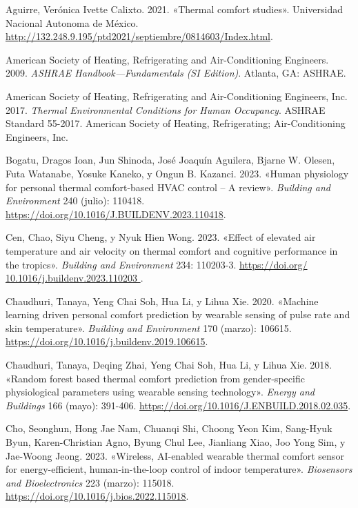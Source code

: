 \documentclass[
  12pt,
  letterpaper,
  DIV=11,
  numbers=noendperiod]{scrreport}
\newlength{\cslhangindent}
\newlength{\cslentryspacingunit} %
\newenvironment{CSLReferences}[2] %
 {%
  \setlength{\parindent}{0pt}
  \ifodd #1
  \let\oldpar\par
  \def\par{\hangindent=\cslhangindent\oldpar}
  \fi
  \setlength{\parskip}{#2\cslentryspacingunit}
 }%
 {}
\begin{document}
\hypertarget{refs}{}
\begin{CSLReferences}{1}{0}
\leavevmode{}%
Aguirre, Verónica Ivette Calixto. 2021. {«Thermal comfort studies»}.
Universidad Nacional Autonoma de México.
\url{http://132.248.9.195/ptd2021/septiembre/0814603/Index.html}.

\leavevmode{}%
American Society of Heating, Refrigerating and Air-Conditioning
Engineers. 2009. \emph{ASHRAE Handbook---Fundamentals (SI Edition)}.
Atlanta, GA: ASHRAE.

\leavevmode{}%
American Society of Heating, Refrigerating and Air-Conditioning
Engineers, Inc. 2017. \emph{Thermal Environmental Conditions for Human
Occupancy}. ASHRAE Standard 55-2017. American Society of Heating,
Refrigerating; Air-Conditioning Engineers, Inc.

\leavevmode{}%
Bogatu, Dragos Ioan, Jun Shinoda, José Joaquín Aguilera, Bjarne W.
Olesen, Futa Watanabe, Yosuke Kaneko, y Ongun B. Kazanci. 2023. {«Human
physiology for personal thermal comfort-based HVAC control -- A
review»}. \emph{Building and Environment} 240 (julio): 110418.
\url{https://doi.org/10.1016/J.BUILDENV.2023.110418}.

\leavevmode{}%
Cen, Chao, Siyu Cheng, y Nyuk Hien Wong. 2023. {«Effect of elevated air
temperature and air velocity on thermal comfort and cognitive
performance in the tropics»}. \emph{Building and Environment} 234:
110203-3.
\href{https://doi.org/\%2010.1016/j.buildenv.2023.110203\%20}{https://doi.org/
10.1016/j.buildenv.2023.110203 }.

\leavevmode{}%
Chaudhuri, Tanaya, Yeng Chai Soh, Hua Li, y Lihua Xie. 2020. {«Machine
learning driven personal comfort prediction by wearable sensing of pulse
rate and skin temperature»}. \emph{Building and Environment} 170
(marzo): 106615. \url{https://doi.org/10.1016/j.buildenv.2019.106615}.

\leavevmode{}%
Chaudhuri, Tanaya, Deqing Zhai, Yeng Chai Soh, Hua Li, y Lihua Xie.
2018. {«Random forest based thermal comfort prediction from
gender-specific physiological parameters using wearable sensing
technology»}. \emph{Energy and Buildings} 166 (mayo): 391-406.
\url{https://doi.org/10.1016/J.ENBUILD.2018.02.035}.

\leavevmode{}%
Cho, Seonghun, Hong Jae Nam, Chuanqi Shi, Choong Yeon Kim, Sang-Hyuk
Byun, Karen-Christian Agno, Byung Chul Lee, Jianliang Xiao, Joo Yong
Sim, y Jae-Woong Jeong. 2023. {«Wireless, AI-enabled wearable thermal
comfort sensor for energy-efficient, human-in-the-loop control of indoor
temperature»}. \emph{Biosensors and Bioelectronics} 223 (marzo): 115018.
\url{https://doi.org/10.1016/j.bios.2022.115018}.


\end{CSLReferences}
\end{document}
